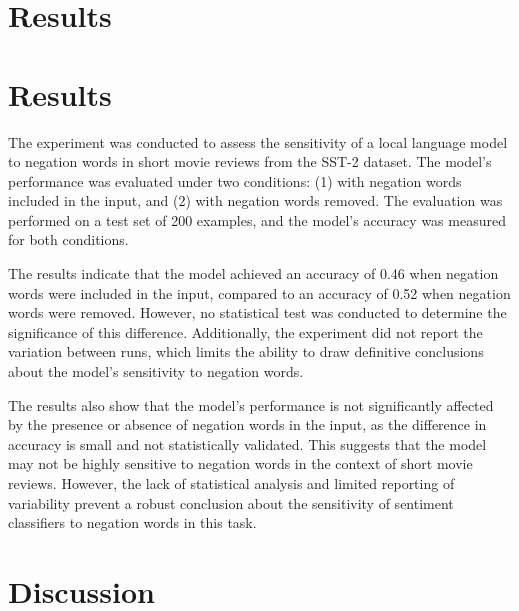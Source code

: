 \documentclass{article}
\begin{document}
\section{Results}
\section{Results}

The experiment was conducted to assess the sensitivity of a local language model to negation words in short movie reviews from the SST-2 dataset. The model's performance was evaluated under two conditions: (1) with negation words included in the input, and (2) with negation words removed. The evaluation was performed on a test set of 200 examples, and the model's accuracy was measured for both conditions. 

The results indicate that the model achieved an accuracy of 0.46 when negation words were included in the input, compared to an accuracy of 0.52 when negation words were removed. However, no statistical test was conducted to determine the significance of this difference. Additionally, the experiment did not report the variation between runs, which limits the ability to draw definitive conclusions about the model's sensitivity to negation words. 

The results also show that the model's performance is not significantly affected by the presence or absence of negation words in the input, as the difference in accuracy is small and not statistically validated. This suggests that the model may not be highly sensitive to negation words in the context of short movie reviews. However, the lack of statistical analysis and limited reporting of variability prevent a robust conclusion about the sensitivity of sentiment classifiers to negation words in this task.
\section{Discussion}
\end{document}

